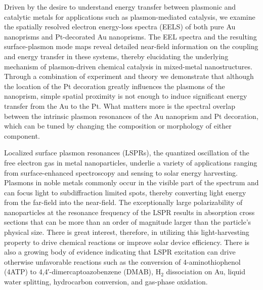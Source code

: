 \documentclass [11pt, proquest] {uwthesis}[2016/11/22]
\newenvironment{ch_abstract}
{%
\begin{center}
\begin{minipage}{\dimexpr\paperwidth-3in}
}
{%
\end{minipage}
\end{center}
}
\begin{document}
\begin{ch_abstract}
Driven by the desire to understand energy transfer between plasmonic and catalytic metals for applications such as plasmon-mediated catalysis, we examine the spatially resolved electron energy-loss spectra (EELS) of both pure Au nanoprisms and Pt-decorated Au nanoprisms. The EEL spectra and the resulting surface-plasmon mode maps reveal detailed near-field information on the coupling and energy transfer in these systems, thereby elucidating the underlying mechanism of plasmon-driven chemical catalysis in mixed-metal nanostructures. Through a combination of experiment and theory we demonstrate that although the location of the Pt decoration greatly influences the plasmons of the nanoprism, simple spatial proximity is not enough to induce significant energy transfer from the Au to the Pt. What matters more is the spectral overlap between the intrinsic plasmon resonances of the Au nanoprism and Pt decoration, which can be tuned by changing the composition or morphology of either component.
\end{ch_abstract}

Localized surface plasmon resonances (LSPRs), the quantized oscillation of the free electron gas in metal nanoparticles, underlie a variety of applications ranging from surface-enhanced spectroscopy\cite{Nie1997,Schlucker,SERS_1,SERS_femto,COINs} and sensing\cite{PCCP,SpecSense} to solar energy harvesting\cite{OPV,waveguides,SiSolar,RiceCrew}. Plasmons in noble metals commonly occur in the visible part of the spectrum and can focus light to subdiffraction limited spots, thereby converting light energy from the far-field into the near-field. The exceptionally large polarizability of nanoparticles at the resonance frequency of the LSPR results in absorption cross sections that can be more than an order of magnitude larger than the particle’s physical size. There is great interest, therefore, in utilizing this light-harvesting property to drive chemical reactions\cite{aminothiophenol,PtAuRods,PtAuPrisms,Halas2013} or improve solar device efficiency\cite{OPV,SiSolar,Linic}. There is also a growing body of evidence indicating that LSPR excitation can drive otherwise unfavorable reactions such as the conversion of 4-aminothiophenol (4ATP) to 4,4′-dimercaptoazobenzene (DMAB),\cite{aminothiophenol,nitrobenzenethiol,KimKimShin} H$_2$ dissociation on Au\cite{Halas2013}, liquid water splitting\cite{watersplitting,photoanodes,Thimsen}, hydrocarbon conversion\cite{Cronin}, and gas-phase oxidation\cite{LinicSilver}.
\end{document}
